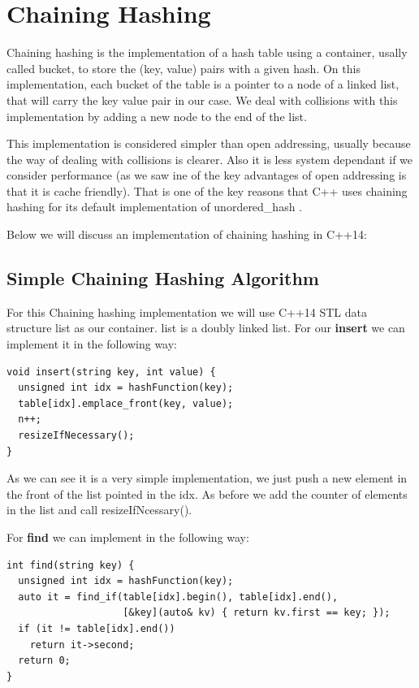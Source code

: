 \section{Chaining Hashing}

Chaining hashing is the implementation of a hash table using a container, usally called bucket, to store the (key, value) pairs with a given hash. On this implementation, each bucket of the table is a pointer to a node of a linked list, that will carry the key value pair in our case. We deal with collisions with this implementation by adding a new node to the end of the list.

This implementation is considered simpler than open addressing, usually because the way of dealing with collisions is clearer. Also it is less system dependant if we consider performance (as we saw ine of the key advantages of open addressing is that it is cache friendly). That is one of the key reasons that C++ uses chaining hashing for its default implementation of unordered\_hash \cite{HashTableProposal}.

Below we will discuss an implementation of chaining hashing in C++14:

\subsection{Simple Chaining Hashing Algorithm}

For this Chaining hashing implementation we will use C++14 STL data structure list as our container. list is a doubly linked list. For our \textbf{insert} we can implement it in the following way:

\begin{lstlisting}
void insert(string key, int value) {
  unsigned int idx = hashFunction(key);      
  table[idx].emplace_front(key, value);
  n++;
  resizeIfNecessary();
}
\end{lstlisting}

As we can see it is a very simple implementation, we just push a new element in the front of the list pointed in the idx. As before we add the counter of elements in the list and call resizeIfNcessary().

For \textbf{find} we can implement in the following way:

\begin{lstlisting}
int find(string key) {
  unsigned int idx = hashFunction(key);
  auto it = find_if(table[idx].begin(), table[idx].end(),
                    [&key](auto& kv) { return kv.first == key; });
  if (it != table[idx].end())
    return it->second;
  return 0;
}
\end{lstlisting}

